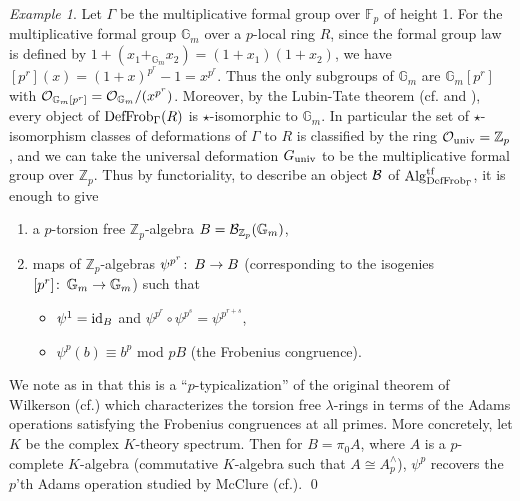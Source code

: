 \documentclass{gtpart}
\theoremstyle{definition}
\theoremstyle{remark}
\newtheorem{exam}[thm]{Example}
\def\co{\colon\thinspace}
\newcommand{\mb}[1]{\mathbb{#1}}
\newcommand{\Alg}{{\rm Alg}}
\newcommand{\CO}{{\cal O}}
\newcommand{\DF}{{{\rm DefFrob}_\Gamma}}
\newcommand{\Gm}{{{\mb G}_m}}
\newcommand{\cff}[2]{cf.\thinspace{\cite[#1]{#2}}}
\begin{document}
\begin{exam}
\label{ex:K}
 Let $\Gamma$ be the multiplicative formal group over ${\mb F}_p$ of height 1.  
 For the multiplicative formal group $\Gm$ over a $p$-local ring $R$, since 
 the formal group law is defined by $1 + (x_1 +_\Gm x_2) = 
 (1 + x_1)(1 + x_2)$, we have $[p^r](x) = (1 + x)^{p^r} - 1 = x^{p^r}$.  Thus 
 the only subgroups of $\Gm$ are $\Gm [p^r]$ with $\CO_{\Gm [p^r]} = 
 \CO_\Gm / (x^{p^r})$.  Moreover, by the Lubin-Tate theorem 
 (\cff{theorem 3.1}{lubintate} and \cite[section 4.3]{H-Mthm}), every object 
 of $\DF(R)$ is $\star$-isomorphic to $\Gm$.  In particular the set of 
 $\star$-isomorphism classes of deformations of $\Gamma$ to $R$ is classified 
 by the ring $\CO_{\rm univ} = {\mb Z}_p$, and we can take the universal 
 deformation $G_{\rm univ}$ to be the multiplicative formal group over 
 ${\mb Z}_p$.  Thus by functoriality, to describe an object ${\cal B}$ of 
 $\Alg_\DF^{\rm tf}$, it is enough to give 
 \begin{enumerate}
  \item a $p$-torsion free ${\mb Z}_p$-algebra $B = 
  {\cal B}_{{\mb Z}_p}(\Gm)$, 
  \item maps of ${\mb Z}_p$-algebras $\psi^{p^r}\co B \to B$ (corresponding to 
  the isogenies $[p^r]\co \Gm \to \Gm$) such that 
  \begin{itemize}
   \item $\psi^1 = {\rm id}_B$ and $\psi^{p^r} \circ \psi^{p^s} = 
   \psi^{p^{r+s}}$, 
   \item $\psi^p(b) \equiv b^p$ mod $pB$ (the Frobenius congruence).  
  \end{itemize}
 \end{enumerate}

 We note as in \cite[example 1.3]{cong} that this is a ``$p$-typicalization'' 
 of the original theorem of Wilkerson (\cff{proposition 1.2}{wilkerson}) 
 which characterizes the torsion free $\lambda$-rings in terms of the Adams 
 operations satisfying the Frobenius congruences at all primes.  More 
 concretely, let $K$ be the complex $K$-theory spectrum.  Then for 
 $B = \pi_0 A$, where $A$ is a $p$-complete $K$-algebra (commutative 
 $K$-algebra such that $A \cong A_p^\wedge$), $\psi^p$ recovers the $p$'th 
 Adams operation studied by McClure (\cff{chapters VIII and IX}{BMMS}).  
 \qed
\end{exam}
\end{document}
